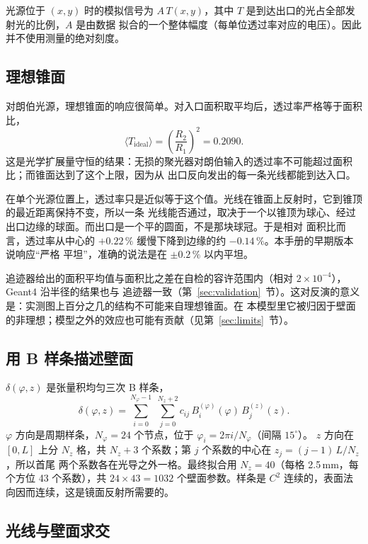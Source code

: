 \documentclass[11pt,a4paper,fontset=fandol]{ctexart}
\begin{document}
光源位于 $(x,y)$ 时的模拟信号为 $A\,T(x,y)$，其中 $T$ 是到达出口的光占全部发射光的比例，$A$ 是由数据
拟合的一个整体幅度（每单位透过率对应的电压）。因此并不使用测量的绝对刻度。

\subsection{理想锥面}
\label{sec:ideal}

对朗伯光源，理想锥面的响应很简单。对入口面积取平均后，透过率严格等于面积比，
\[
  \langle T_\mathrm{ideal}\rangle = \left(\frac{R_2}{R_1}\right)^2 = 0.2090 .
\]
这是光学扩展量守恒的结果：无损的聚光器对朗伯输入的透过率不可能超过面积比；而锥面达到了这个上限，因为从
出口反向发出的每一条光线都能到达入口。

在单个光源位置上，透过率只是近似等于这个值。光线在锥面上反射时，它到锥顶的最近距离保持不变，所以一条
光线能否通过，取决于一个以锥顶为球心、经过出口边缘的球面。而出口是一个平的圆面，不是那块球冠。于是相对
面积比而言，透过率从中心的 $+0.22\,\%$ 缓慢下降到边缘的约 $-0.14\,\%$。本手册的早期版本说响应“严格
平坦”，准确的说法是在 $\pm0.2\,\%$ 以内平坦。

追迹器给出的面积平均值与面积比之差在自检的容许范围内（相对 $2\times10^{-4}$），Geant4 沿半径的结果也与
追迹器一致（第~\ref{sec:validation}~节）。这对反演的意义是：实测图上百分之几的结构不可能来自理想锥面。在
本模型里它被归因于壁面的非理想；模型之外的效应也可能有贡献（见第~\ref{sec:limits}~节）。

\subsection{用 B 样条描述壁面}

$\delta(\varphi,z)$ 是张量积均匀三次 B 样条，
\[
  \delta(\varphi,z) = \sum_{i=0}^{N_\varphi-1}\;\sum_{j=0}^{N_z+2} c_{ij}\,B_i^{(\varphi)}(\varphi)\,B_j^{(z)}(z).
\]
$\varphi$ 方向是周期样条，$N_\varphi=24$ 个节点，位于 $\varphi_i = 2\pi i/N_\varphi$（间隔 $15^\circ$）。
$z$ 方向在 $[0,L]$ 上分 $N_z$ 格，共 $N_z+3$ 个系数；第 $j$ 个系数的中心在 $z_j=(j-1)\,L/N_z$，所以首尾
两个系数各在光导之外一格。最终拟合用 $N_z=40$（每格 2.5\,mm，每个方位 43 个系数），共
$24\times43=1032$ 个壁面参数。样条是 $C^2$ 连续的，表面法向因而连续，这是镜面反射所需要的。

\subsection{光线与壁面求交}
\label{sec:intersection}
\end{document}
